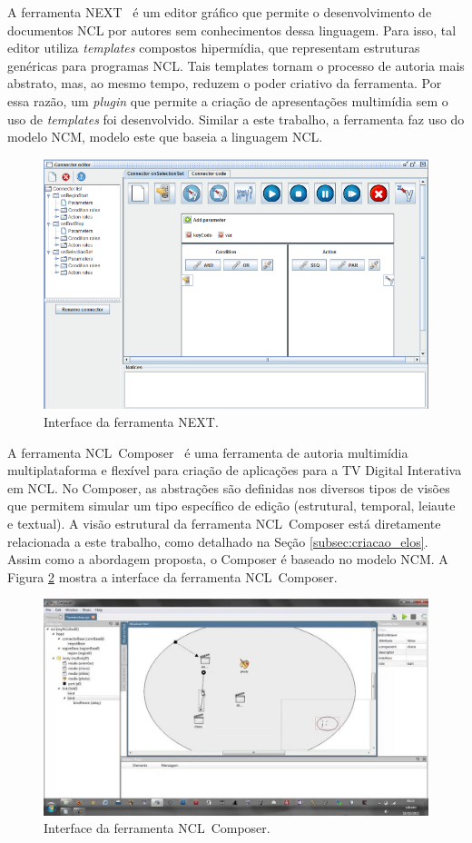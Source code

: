 \documentclass[../main.tex]{subfiles}
\begin{document}
A ferramenta NEXT~\cite{paulo_de_mattos_next_2013} é um editor gráfico que permite o desenvolvimento de documentos NCL por autores sem conhecimentos dessa linguagem. Para isso, tal editor utiliza \emph{templates} compostos hipermídia, que representam estruturas genéricas para programas NCL. Tais templates tornam o processo de autoria mais abstrato, mas, ao mesmo tempo, reduzem o poder criativo da ferramenta. Por essa razão, um \emph{plugin} que permite a criação de apresentações multimídia sem o uso de \emph{templates} foi desenvolvido. Similar a este trabalho, a ferramenta faz uso do modelo NCM, modelo este que baseia a linguagem NCL.

\begin{figure}[!h]
\centering
\includegraphics[width=0.5\linewidth]{IMG/Relacionados/next.png}
\caption{Interface da ferramenta NEXT.}
\label{fig:next}
\end{figure}

A ferramenta NCL~Composer~\cite{azevedo_composer_2014} é uma ferramenta de autoria multimídia multiplataforma e flexível para criação de aplicações para a TV Digital Interativa em NCL. No Composer, as abstrações são definidas nos diversos tipos de visões que permitem simular um tipo específico de edição (estrutural, temporal, leiaute e textual). A visão estrutural da ferramenta NCL~Composer está diretamente relacionada a este trabalho, como detalhado na Seção \ref{subsec:criacao_elos}. Assim como a abordagem proposta, o Composer é baseado no modelo NCM. A Figura \ref{fig:composer} mostra a interface da ferramenta NCL~Composer.

\begin{figure}[!h]
\centering
\includegraphics[width=0.5\linewidth]{IMG/Relacionados/composer.jpg}
\caption{Interface da ferramenta NCL~Composer.}
\label{fig:composer}
\end{figure}
\end{document}
